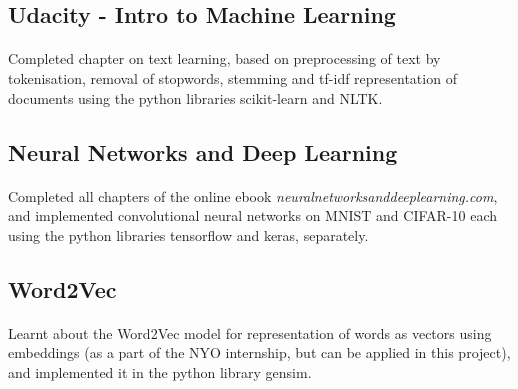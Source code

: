 \documentclass{article}
\begin{document}
        \subsection*{\fontsize{16}{20}\selectfont Udacity - Intro to Machine Learning}
        	\vspace{+1mm}\paragraph{}{\fontsize{13}{16}\selectfont Completed chapter on text learning, based on preprocessing of text by tokenisation, removal of stopwords, stemming and tf-idf representation of documents using the python libraries scikit-learn and NLTK.}\\[-2mm]
        
        \subsection*{\fontsize{16}{20}\selectfont Neural Networks and Deep Learning}
        	\vspace{+1mm}\paragraph{}{\fontsize{13}{16}\selectfont Completed all chapters of the online ebook \textit{neuralnetworksanddeeplearning.com}, and implemented convolutional neural networks on MNIST and CIFAR-10 each using the python libraries tensorflow and keras, separately.}\\[-2mm]
        
        \subsection*{\fontsize{16}{20}\selectfont Word2Vec}
        	\vspace{+1mm}\paragraph{}{\fontsize{13}{16}\selectfont Learnt about the Word2Vec model for representation of words as vectors using embeddings (as a part of the NYO internship, but can be applied in this project), and implemented it in the python library gensim.}
        
    
\end{document}
